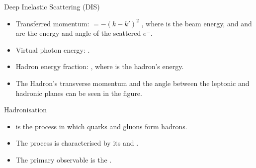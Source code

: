 \begin{frame}{Deep Inelastic Scattering (DIS)}
    \label{10.12::dis}

    \begin{itemize}
        \item
            Transferred momentum:  $= -(k - k')^2$ , where  is the beam energy, and  and  are the energy and angle of the scattered $e^-$.

        \item
            Virtual photon energy: .

        \item
            Hadron energy fraction: , where  is the hadron's energy.

        \item
            The Hadron's transverse momentum  and the angle between the leptonic and hadronic planes  can be seen in the figure.
    \end{itemize}

    \begin{center}
        \begin{figure}[t]
        \end{figure}
    \end{center}
\end{frame}

\begin{frame}{Hadronisation}
    \label{10.13::hadronisation}

    \begin{itemize}
        \item
             is the process in which quarks and gluons form hadrons.

        \vspace{6pt}
        \item
            The process is characterised by its  and .

        \vspace{6pt}
        \item
            The primary observable is the .
    \end{itemize}

    \vspace{6pt}
    \begin{center}
        \begin{figure}[t]
        \end{figure}
    \end{center}

\end{frame}
